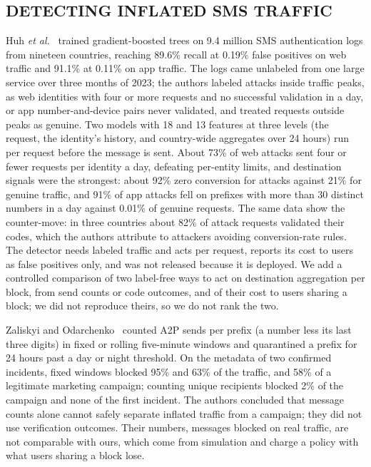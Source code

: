 \documentclass{IEEEoj}
\begin{document}
\subsection{DETECTING INFLATED SMS TRAFFIC}
Huh \textit{et al.}~\cite{huh2025ait} trained gradient-boosted trees on 9.4 million SMS authentication logs from nineteen countries, reaching 89.6\% recall at 0.19\% false positives on web traffic and 91.1\% at 0.11\% on app traffic. The logs came unlabeled from one large service over three months of 2023; the authors labeled attacks inside traffic peaks, as web identities with four or more requests and no successful validation in a day, or app number-and-device pairs never validated, and treated requests outside peaks as genuine. Two models with 18 and 13 features at three levels (the request, the identity's history, and country-wide aggregates over 24 hours) run per request before the message is sent. About 73\% of web attacks sent four or fewer requests per identity a day, defeating per-entity limits, and destination signals were the strongest: about 92\% zero conversion for attacks against 21\% for genuine traffic, and 91\% of app attacks fell on prefixes with more than 30 distinct numbers in a day against 0.01\% of genuine requests. The same data show the counter-move: in three countries about 82\% of attack requests validated their codes, which the authors attribute to attackers avoiding conversion-rate rules. The detector needs labeled traffic and acts per request, reports its cost to users as false positives only, and was not released because it is deployed. We add a controlled comparison of two label-free ways to act on destination aggregation per block, from send counts or code outcomes, and of their cost to users sharing a block; we did not reproduce theirs, so we do not rank the two.

Zaliskyi and Odarchenko~\cite{zaliskyi2026ait} counted A2P sends per prefix (a number less its last three digits) in fixed or rolling five-minute windows and quarantined a prefix for 24 hours past a day or night threshold. On the metadata of two confirmed incidents, fixed windows blocked 95\% and 63\% of the traffic, and 58\% of a legitimate marketing campaign; counting unique recipients blocked 2\% of the campaign and none of the first incident. The authors concluded that message counts alone cannot safely separate inflated traffic from a campaign; they did not use verification outcomes. Their numbers, messages blocked on real traffic, are not comparable with ours, which come from simulation and charge a policy with what users sharing a block lose.
\end{document}
